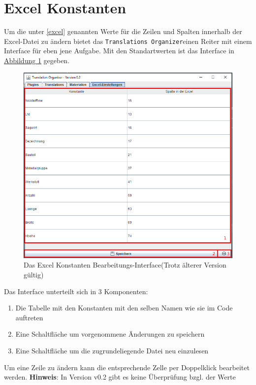 \documentclass{book}
\newcommand{\assisttool}{\texttt{Translations Organizer}}
\newcommand{\hinweis}[1]{\newline \textbf{Hinweis}: #1 \newline}
\begin{document}
	 	\section{Excel Konstanten}\label{excel konstanten}
			 Um die unter \ref{excel} genannten Werte für die Zeilen und Spalten innerhalb der Excel-Datei zu ändern bietet das \assisttool einen Reiter mit einem Interface für eben jene Aufgabe. Mit den Standartwerten ist das Interface in \hyperref[fig:excel constants]{Abbildung \ref{fig:excel constants}} gegeben.
		 	\begin{figure}[H]
		 		\centering
		 		\includegraphics[scale=0.48]{pics/assisttool/excel-konstanten.PNG}
		 		\caption{Das Excel Konstanten Bearbeitungs-Interface\newline (Trotz älterer Version gültig)}
		 		\label{fig:excel constants}
		 	\end{figure}
		 	Das Interface unterteilt sich in 3 Komponenten:
			 	\begin{enumerate}
			 		\item Die Tabelle mit den Konstanten mit den selben Namen wie sie im Code auftreten
			 		\item Eine Schaltfläche um vorgenommene Änderungen zu speichern
			 		\item Eine Schaltfläche um die zugrundeliegende Datei neu einzulesen
			 	\end{enumerate}
		 	
		 	Um eine Zeile zu ändern kann die entsprechende Zelle per Doppelklick bearbeitet werden.
		 	\hinweis{In Version v0.2 gibt es keine Überprüfung bzgl. der Werte}
	 	
\end{document}
